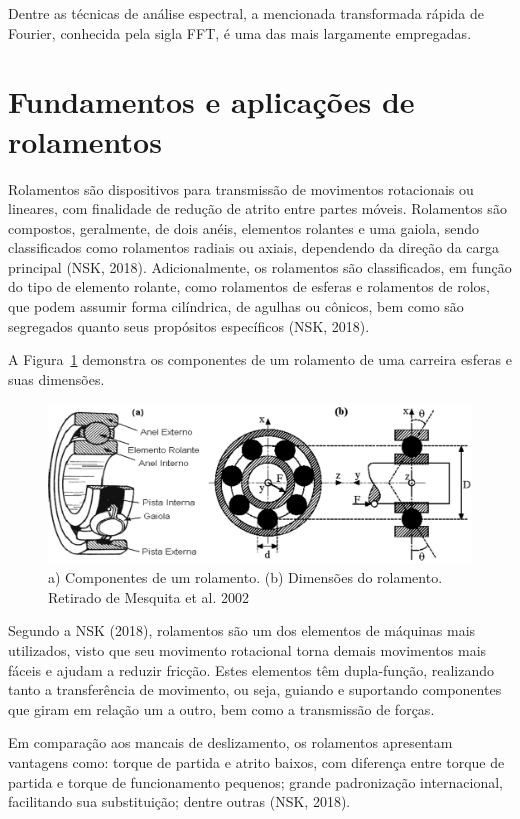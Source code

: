 \documentclass[
	12pt,				
	oneside,			
	a4paper,			
	english,			
	brazil,			
	]{abntex2ppgsi}
\begin{document}
Dentre as técnicas de análise espectral, a mencionada transformada rápida de Fourier, conhecida pela sigla FFT, é uma das mais largamente empregadas. 

\section{\textbf{Fundamentos e aplicações de rolamentos}}
Rolamentos são dispositivos para transmissão de movimentos rotacionais ou lineares, com finalidade de redução de atrito entre partes móveis. Rolamentos são compostos, geralmente, de dois anéis, elementos rolantes e uma gaiola, sendo classificados como rolamentos radiais ou axiais, dependendo da direção da carga principal (NSK, 2018). Adicionalmente, os rolamentos são classificados, em função do tipo de elemento rolante, como rolamentos de esferas e rolamentos de rolos, que podem assumir forma cilíndrica, de agulhas ou cônicos, bem como são segregados quanto seus propósitos específicos (NSK, 2018).

A Figura~\ref{ComponentesRolamentos} demonstra os componentes de um rolamento de uma carreira esferas e suas dimensões. 

\begin{figure}[!htb]
\centering
\includegraphics[width=\textwidth,height=\textheight,keepaspectratio]{Figura1}
\caption{a) Componentes de um rolamento. (b) Dimensões do rolamento. Retirado de Mesquita et al. 2002}
\label{ComponentesRolamentos}
\end{figure}

Segundo a NSK (2018), rolamentos são um dos elementos de máquinas mais utilizados, visto que seu movimento rotacional torna demais movimentos mais fáceis e ajudam a reduzir fricção. Estes elementos têm dupla-função, realizando tanto a transferência de movimento, ou seja, guiando e suportando componentes que giram em relação um a outro, bem como a transmissão de forças.

Em comparação aos mancais de deslizamento, os rolamentos apresentam vantagens como: torque de partida e atrito baixos, com diferença entre torque de partida e torque de funcionamento pequenos; grande padronização internacional, facilitando sua substituição; dentre outras (NSK, 2018).
\end{document}
